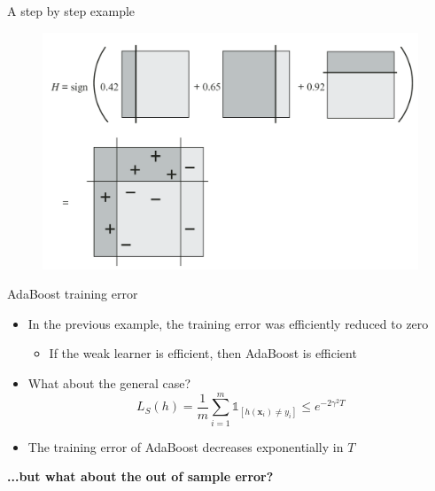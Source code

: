 \begin{frame}{A step by step example}
    \begin{figure}
        \includegraphics[width=\textwidth]{img/example_result}
    \end{figure}
\end{frame}

\begin{frame}{AdaBoost training error}
    \begin{itemize} \pause
        \item In the previous example, the training error was efficiently reduced to zero
        \begin{itemize}
            \item If the weak learner is efficient, then AdaBoost is efficient
        \end{itemize} \pause
        \item What about the general case? \pause
        \begin{equation*}
            L_S(h) = \frac{1}{m} \sum_{i=1}^m \mathds{1}_{\left[ h(\mathbf{x}_i) \neq y_i \right]} \leq e^{-2 \gamma^2 T}
        \end{equation*} \pause
        \item The training error of AdaBoost decreases exponentially in $T$ \pause
    \end{itemize}
    \textbf{...but what about the out of sample error?}
\end{frame}

